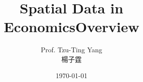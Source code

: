 \documentclass[hyperref={pdfpagelabels=false}]{beamer}
\title[]  
{Spatial Data in Economics}
\author 
{Prof. Tzu-Ting Yang  \\ 楊子霆}
\institute{Institute of Economics, Academia Sinica  \\ 中央研究院經濟研究所}
\date
{\today}
\begin{document}
	
	
	\begin{frame}{}
	\titlepage
\end{frame}






\title[]  
{Overview}


\author 
{}

\institute{}






\date
{}


\begin{frame}{}
	\titlepage
\end{frame}





\end{document}
